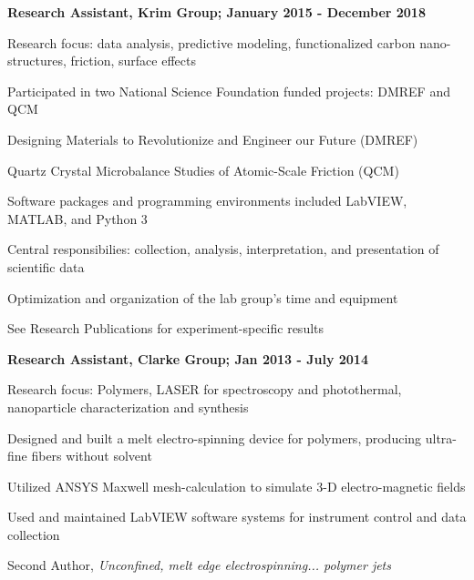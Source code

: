 \documentclass[letterpaper,final]{memoir}
\newcommand{\Sep}{\vspace{1.0em}}
\newcommand{\SmallSep}{\vspace{0.4em}}
\newcommand{\CVItem}[1]
	{\textbf{\color{Blue} #1}}
\begin{document}
\CVItem{Research Assistant, Krim Group; January 2015 - December 2018} 
\begin{compactitem}[\color{Blue}$\circ$]
   
    \SmallSep

    \item Research focus: data analysis, predictive modeling, functionalized carbon nano-structures, friction, surface effects
    \item Participated in two National Science Foundation funded projects: DMREF and QCM
    \item Designing Materials to Revolutionize and Engineer our Future (DMREF)
    \item Quartz Crystal Microbalance Studies of Atomic-Scale Friction (QCM)
    \item Software packages and programming environments included LabVIEW, MATLAB, and Python 3
    \item Central responsibilies: collection, analysis, interpretation, and presentation of scientific data
    \item Optimization and organization of the lab group's time and equipment
    \item See Research Publications for experiment-specific results
\end{compactitem}

\Sep

\CVItem{Research Assistant, Clarke Group; Jan 2013 - July 2014}
\begin{compactitem}[\color{Blue}$\circ$]
    
    \SmallSep

    \item Research focus: Polymers, LASER for spectroscopy and photothermal, nanoparticle characterization and synthesis
    \item Designed and built a melt electro-spinning device for polymers, producing ultra-fine fibers without solvent
    \item Utilized ANSYS Maxwell mesh-calculation to simulate 3-D electro-magnetic fields
    \item Used and maintained LabVIEW software systems for instrument control and data collection
    \item Second Author, \textit{Unconfined, melt edge electrospinning... polymer jets}

\end{compactitem}

\Sep
\end{document}
